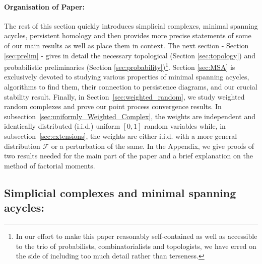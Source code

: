 \documentclass[12pt]{amsart}
\newcommand{\dy}[1]{\textcolor{magenta}{#1}}
\newcommand{\gt}[1]{\textcolor{blue}{#1}}
\renewcommand{\dy}[1]{#1}
\renewcommand{\gt}[1]{#1}
\numberwithin{equation}{section}
\numberwithin{theorem}{section}
\newcommand{\1}{\mathbf{1}}
\def\sF{\mathscr{F}}
\begin{document}
\paragraph{\sc Organisation of Paper:} The rest of this section quickly introduces simplicial complexes, minimal spanning acycles, persistent homology and then provides more precise statements of some of our main results as well as place them in context. The next section - Section \ref{sec:prelim} - gives in detail the necessary topological (Section \ref{sec:topology}) and probabilistic preliminaries (Section \ref{sec:probability})\footnote{In our effort to make this paper reasonably self-contained as well as accessible to the trio of probabilists, combinatorialists and topologists, we have erred on the side of including too much detail rather than terseness.}. Section \ref{sec:MSA} is exclusively devoted to studying various properties of minimal spanning acycles, algorithms to  find them,  their connection to persistence diagrams, and our crucial stability result. \gt{Finally, in Section~\ref{sec:weighted_random}, we study weighted random complexes} and prove our point process convergence results. In subsection~\ref{sec:uniformly_Weighted_Complex}, the weights are independent and identically distributed (i.i.d.) uniform $[0,1]$ random variables while, in subsection~\ref{sec:extensions}, the weights are either i.i.d. with a more general distribution $\sF$ or a perturbation of the same. \dy{In the Appendix, we give proofs of two results needed for the main part of the paper and a brief explanation on the method of factorial moments.}



\subsection{Simplicial complexes and minimal spanning acycles:}
\label{ssec:msa}
\end{document}
